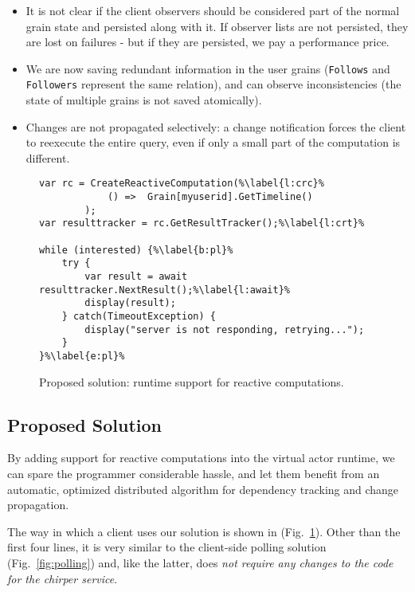 \hidden
{\begin{itemize}
\item It is not clear if the client observers should be considered part of the normal grain state and persisted along with it. If observer lists are not persisted, they are lost on failures - but if they are persisted, we pay a performance price.
\item We are now saving redundant information in the user grains (\lstinline{Follows} and \lstinline{Followers} represent the same relation), and can observe inconsistencies  (the state of multiple grains is not saved atomically).  
\item Changes are not propagated selectively: a change notification forces the client to reexecute the entire query, even if only a small part of the computation is different.
\end{itemize}
}



\begin{figure}
\begin{lstlisting}
var rc = CreateReactiveComputation(%\label{l:crc}%
			() =>  Grain[myuserid].GetTimeline()
	 	);
var resulttracker = rc.GetResultTracker();%\label{l:crt}%

while (interested) {%\label{b:pl}%
	try {
		var result = await resulttracker.NextResult();%\label{l:await}%
		display(result);
	} catch(TimeoutException) { 
		display("server is not responding, retrying...");
	}
}%\label{e:pl}%
\end{lstlisting}
\caption{Proposed solution: runtime support for reactive computations.}\label{fig:rcapi}
\end{figure}


\subsection{Proposed Solution}

By adding support for reactive computations into the virtual actor runtime, we can spare the programmer considerable hassle, and let them benefit from an automatic, optimized distributed algorithm for dependency tracking and change propagation. 

The way in which a client uses our solution is shown in  (Fig.~\ref{fig:rcapi}). Other than the first four lines, it is very similar to the client-side polling solution (Fig.~\ref{fig:polling}) and, like the latter, does \emph{not require any changes to the code for the chirper service}. 

